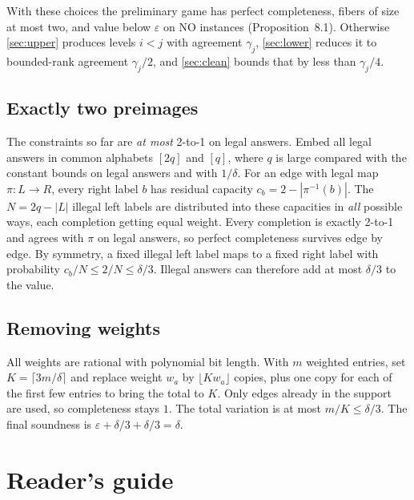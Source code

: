 \documentclass[11pt]{article}
\theoremstyle{definition}
\theoremstyle{remark}
\newcommand{\eps}{\varepsilon}
\begin{document}
With these choices the preliminary game has perfect completeness, fibers of
size at most two, and value below $\eps$ on NO instances (Proposition~8.1).
Otherwise \cref{sec:upper} produces levels $i<j$ with agreement $\gamma_j$,
\cref{sec:lower} reduces it to bounded-rank agreement $\gamma_j/2$, and
\cref{sec:clean} bounds that by less than $\gamma_j/4$.

\subsection{Exactly two preimages}

The constraints so far are \emph{at most} 2-to-1 on legal answers. Embed all
legal answers in common alphabets $[2q]$ and $[q]$, where $q$ is large
compared with the constant bounds on legal answers and with $1/\delta$. For an
edge with legal map $\pi:L\to R$, every right label $b$ has residual capacity
$c_b=2-|\pi^{-1}(b)|$. The $N=2q-|L|$ illegal left labels are distributed into
these capacities in \emph{all} possible ways, each completion getting equal
weight. Every completion is exactly 2-to-1 and agrees with $\pi$ on legal
answers, so perfect completeness survives edge by edge. By symmetry, a fixed
illegal left label maps to a fixed right label with probability
$c_b/N\le2/N\le\delta/3$. Illegal answers can therefore add at most $\delta/3$
to the value.

\subsection{Removing weights}

All weights are rational with polynomial bit length. With $m$ weighted
entries, set $K=\lceil3m/\delta\rceil$ and replace weight $w_a$ by
$\lfloor Kw_a\rfloor$ copies, plus one copy for each of the first few entries
to bring the total to $K$. Only edges already in the support are used, so
completeness stays $1$. The total variation is at most $m/K\le\delta/3$. The
final soundness is $\eps+\delta/3+\delta/3=\delta$.

\section{Reader's guide}\label{sec:reader}
\end{document}
